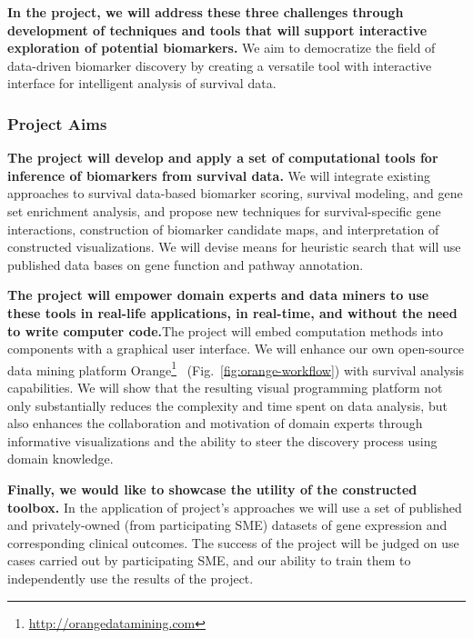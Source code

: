 \documentclass[11pt,a4paper]{article}
\newcommand{\myurl}[1]{\footnote{\url{#1}}}
\renewcommand{\bold}{\textbf}
\begin{document}
\bold{In the project, we will address these three challenges through development of techniques and tools that will support interactive exploration of potential biomarkers.} We aim to democratize the field of data-driven biomarker discovery by creating a versatile tool with interactive interface for intelligent analysis of survival data.

\subsubsection*{Project Aims}

\bold{The project will develop and apply a set of computational tools for inference of biomarkers from survival data.} We will integrate existing approaches to survival data-based biomarker scoring, survival modeling, and gene set enrichment analysis, and propose new techniques for survival-specific gene interactions, construction of biomarker candidate maps, and interpretation of constructed visualizations. We will devise means for heuristic search that will use published data bases on gene function and pathway annotation.

\bold{The project will empower domain experts and data miners to use these tools in real-life applications, in real-time, and without the need to write computer code.}The project will embed computation methods into components with a graphical user interface. We will enhance our own open-source data mining platform Orange\myurl{http://orangedatamining.com}~\cite{Demsar2013,Curk2005,Godec2019} (Fig.~\ref{fig:orange-workflow}) with survival analysis capabilities. We will show that the resulting visual programming platform not only substantially reduces the complexity and time spent on data analysis, but also enhances the collaboration and motivation of domain experts through informative visualizations and the ability to steer the discovery process using domain knowledge.

\bold{Finally, we would like to showcase the utility of the constructed toolbox.} In the application of project's approaches we will use a set of published and privately-owned (from participating SME) datasets of gene expression and corresponding clinical outcomes. The success of the project will be judged on use cases carried out by participating SME, and our ability to train them to independently use the results of the project.
\end{document}
